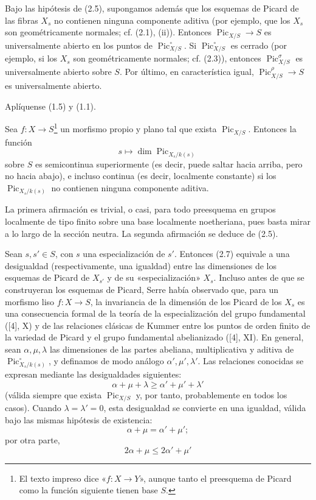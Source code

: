  Bajo las hipótesis de (2.5), supongamos además que los
esquemas de Picard de las fibras $X_s$ no contienen ninguna componente aditiva
(por ejemplo, que los $X_s$ son geométricamente normales; cf. (2.1), (ii)).
Entonces $\operatorname{Pic}_{X/S}\longrightarrow S$ es universalmente abierto
en los puntos de $\operatorname{Pic}_{X/S}^\circ$. Si
$\operatorname{Pic}_{X/S}^\circ$ es cerrado (por ejemplo, si los $X_s$ son
geométricamente normales; cf. (2.3)), entonces
$\operatorname{Pic}_{X/S}^\sigma$ es universalmente abierto sobre $S$. Por
último, en característica igual,
$\operatorname{Pic}_{X/S}^\rho\longrightarrow S$ es universalmente abierto.

Aplíquense (1.5) y (1.1).

 Sea $f:X\longrightarrow S$\footnote{El texto impreso
dice «$f:X\longrightarrow Y$», aunque tanto el preesquema de Picard como la
función siguiente tienen base $S$.} un morfismo propio y plano tal que exista
$\operatorname{Pic}_{X/S}$. Entonces la función
\[
s\longmapsto\dim\operatorname{Pic}_{X_s/k(s)}
\]
sobre $S$ es semicontinua superiormente (es decir, puede saltar hacia arriba,
pero no hacia abajo), e incluso continua (es decir, localmente constante) si
los $\operatorname{Pic}_{X_s/k(s)}$ no contienen ninguna componente aditiva.

La primera afirmación es trivial, o casi, para todo preesquema en grupos
localmente de tipo finito sobre una base localmente noetheriana, pues basta
mirar a lo largo de la sección neutra. La segunda afirmación se deduce de
(2.5).

 Sean $s,s'\in S$, con $s$ una especialización de
$s'$. Entonces (2.7) equivale a una desigualdad (respectivamente, una igualdad)
entre las dimensiones de los esquemas de Picard de $X_{s'}$ y de su
«especialización» $X_s$. Incluso antes de que se construyeran los esquemas de
Picard, Serre había observado que, para un morfismo liso
$f:X\longrightarrow S$, la invariancia de la dimensión de los Picard de los
$X_s$ es una consecuencia formal de la teoría de la especialización del grupo
fundamental ([4], X) y de las relaciones clásicas de Kummer entre los puntos de
orden finito de la variedad de Picard y el grupo fundamental abelianizado
([4], XI). En general, sean $\alpha,\mu,\lambda$ las dimensiones de las partes
abeliana, multiplicativa y aditiva de
$\operatorname{Pic}_{X_s/k(s)}^\circ$, y definamos de modo análogo
$\alpha',\mu',\lambda'$. Las relaciones conocidas se expresan mediante las
desigualdades siguientes:
\[
\tag{*}\alpha+\mu+\lambda\geq\alpha'+\mu'+\lambda'
\]
(válida siempre que exista $\operatorname{Pic}_{X/S}$ y, por tanto,
probablemente en todos los casos). Cuando $\lambda=\lambda'=0$, esta
desigualdad se convierte en una igualdad, válida bajo las mismas hipótesis de
existencia:
\[
\alpha+\mu=\alpha'+\mu';
\]
por otra parte,
\[
\tag{**}2\alpha+\mu\leq2\alpha'+\mu'
\]

